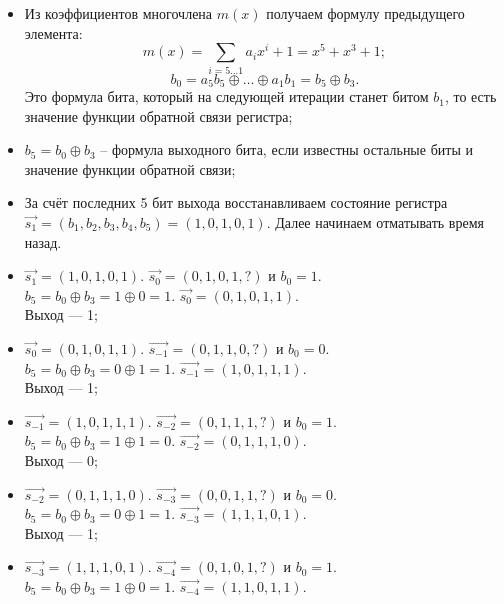\begin{itemize}\itemsep1pt \parskip0pt 
	\item Из коэффициентов многочлена $m\left(x\right)$ получаем формулу предыдущего элемента:
		\[ m\left(x\right) = \sum\limits_{i = 5 \dots 1} {a_i x^i } + 1 = x^{5} + x^{3} + 1; \]
		\[ b_0 = a_5 b_5 \oplus \dots \oplus a_1 b_1 = b_{5} \oplus b_{3}.\]
		Это формула бита, который на следующей итерации станет битом $b_1$, то есть значение функции обратной связи регистра;
	\item $b_5 = b_0\oplus b_{3}$ -- формула выходного бита, если известны остальные биты и значение функции обратной связи;
	\item За счёт последних 5 бит выхода восстанавливаем состояние регистра $\overrightarrow{s_{1}}=\left(b_{1},b_{2},b_{3},b_{4},b_{5}\right) = \left(1,0,1,0,1\right)$. Далее начинаем отматывать время назад.
	\item $\overrightarrow{s_{1}}=\left(1,0,1,0,1\right)$. $\overrightarrow {s_{0}} = \left(0,1,0,1,? \right)$ и $b_0 = 1$. \\
		$b_5 = b_0\oplus b_{3}=1 \oplus 0=1$. $\overrightarrow{s_{0}}=\left(0,1,0,1,1\right)$. \\
		Выход — 1;
	\item $\overrightarrow{s_{0}}=\left(0,1,0,1,1\right)$. $\overrightarrow {s_{-1}} = \left(0,1,1,0,? \right)$ и $b_0 = 0$. \\
		$b_5 = b_0\oplus b_{3}=0 \oplus 1=1$. $\overrightarrow{s_{-1}}=\left(1,0,1,1,1\right)$. \\
		Выход — 1;
	\item $\overrightarrow{s_{-1}}=\left(1,0,1,1,1\right)$. $\overrightarrow {s_{-2}} = \left(0,1,1,1,? \right)$ и $b_0 = 1$. \\
		$b_5 = b_0\oplus b_{3}=1 \oplus 1=0$. $\overrightarrow{s_{-2}}=\left(0,1,1,1,0\right)$. \\
		Выход — 0;
	\item $\overrightarrow{s_{-2}}=\left(0,1,1,1,0\right)$. $\overrightarrow {s_{-3}} = \left(0,0,1,1,? \right)$ и $b_0 = 0$. \\
		$b_5 = b_0\oplus b_{3}=0 \oplus 1=1$. $\overrightarrow{s_{-3}}=\left(1,1,1,0,1\right)$. \\
		Выход — 1;
	\item $\overrightarrow{s_{-3}}=\left(1,1,1,0,1\right)$. $\overrightarrow {s_{-4}} = \left(0,1,0,1,? \right)$ и $b_0 = 1$. \\
		$b_5 = b_0\oplus b_{3}=1 \oplus 0=1$. $\overrightarrow{s_{-4}}=\left(1,1,0,1,1\right)$. \\

\end{itemize}
